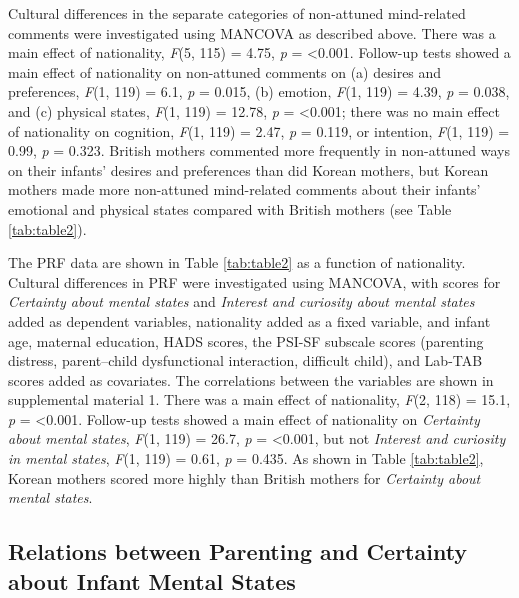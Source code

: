 \documentclass[
]{article}
\begin{document}
Cultural differences in the separate categories of non-attuned mind-related comments were investigated using MANCOVA as described above.
There was a main effect of nationality, \emph{F}(5, 115) = 4.75, \emph{p} = \textless0.001.
Follow-up tests showed a main effect of nationality on non-attuned comments on (a)
desires and preferences, \emph{F}(1, 119) = 6.1, \emph{p} = 0.015, (b)
emotion, \emph{F}(1, 119) = 4.39, \emph{p} = 0.038, and (c)
physical states, \emph{F}(1, 119) = 12.78, \emph{p} = \textless0.001;
there was no main effect of nationality on cognition, \emph{F}(1, 119) = 2.47, \emph{p} = 0.119,
or intention, \emph{F}(1, 119) = 0.99, \emph{p} = 0.323.
British mothers commented more frequently in non-attuned ways on their infants' desires and preferences than did Korean mothers, but Korean mothers made more non-attuned mind-related comments about their infants' emotional and physical states compared with British mothers (see Table \ref{tab:table2}).

The PRF data are shown in Table \ref{tab:table2} as a function of nationality. Cultural differences in PRF were investigated using MANCOVA, with scores for \emph{Certainty about mental states} and \emph{Interest and curiosity about mental states} added as dependent variables, nationality added as a fixed variable, and infant age, maternal education, HADS scores, the PSI-SF subscale scores (parenting distress, parent--child dysfunctional interaction, difficult child), and Lab-TAB scores added as covariates. The correlations between the variables are shown in supplemental material 1. There was a main effect of nationality, \emph{F}(2, 118) = 15.1, \emph{p} = \textless0.001.
Follow-up tests showed a main effect of nationality on \emph{Certainty about mental states},
\emph{F}(1, 119) = 26.7, \emph{p} = \textless0.001, but not \emph{Interest and curiosity in mental states},
\emph{F}(1, 119) = 0.61, \emph{p} = 0.435. As shown in Table \ref{tab:table2},
Korean mothers scored more highly than British mothers for \emph{Certainty about mental states}.

\hypertarget{relations-between-parenting-and-certainty-about-infant-mental-states}{%
\subsection*{Relations between Parenting and Certainty about Infant Mental States}\label{relations-between-parenting-and-certainty-about-infant-mental-states}}
\end{document}
